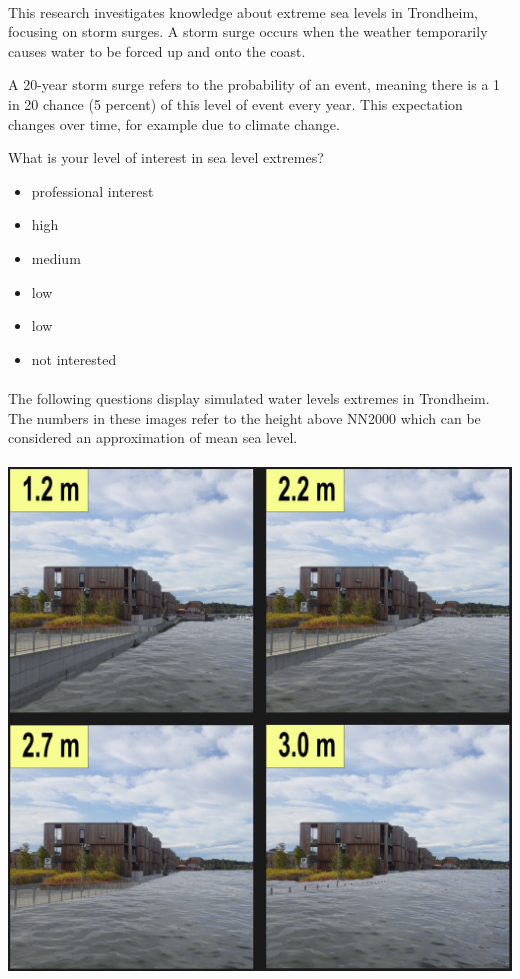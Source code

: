 \paragraph{}

This research investigates knowledge about extreme sea levels in Trondheim, focusing on storm surges. A storm surge occurs when the weather temporarily causes water to be forced up and onto the coast.

A 20-year storm surge refers to the probability of an event, meaning there is a 1 in 20 chance (5 percent) of this level of event every year. This expectation changes over time, for example due to climate change.
\newpage

What is your level of interest in sea level extremes?
\begin{itemize}
    \item professional interest
    \item high
    \item medium
    \item low
    \item low
    \item not interested
\end{itemize}
\paragraph{}

The following questions display simulated water levels extremes in Trondheim. The numbers in these images refer to the height above NN2000 which can be considered an approximation of mean sea level.
\paragraph{}
\includegraphics[width=1\textwidth]{fig_appendix/grillstad 2090 q.png}

